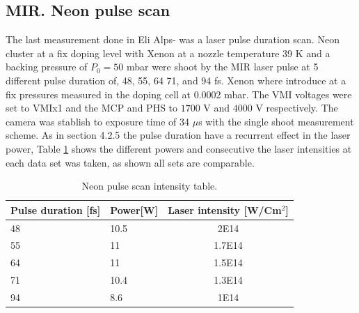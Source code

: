 \subsection{MIR. Neon pulse scan}

The last measurement done in Eli Alps- was a laser pulse duration scan. Neon cluster at a fix doping level with Xenon at a  nozzle temperature 39 K and a backing pressure of $P_{0}=50$ mbar  were shoot by the MIR laser pulse at 5 different pulse duration of, 48, 55, 64 71, and 94 fs. Xenon where introduce at a fix pressures measured in the doping cell at 0.0002 mbar. The VMI voltages were set to VMIx1 and the MCP and PHS to $1700$ V and $4000$ V respectively. The camera was stablish to exposure time of 34 $\mu$s with the single shoot measurement scheme. As in section 4.2.5 the pulse duration have a recurrent effect in the laser power, Table \ref{tab:Neonpulsepower} shows the different powers and consecutive the laser intensities at each data set was taken, as shown all sets are comparable.

\begin{table}[t]
\centering

\begin{tabular}{|l|l|c|}
\hline
Pulse duration {[}fs{]} & \multicolumn{1}{c|}{Power{[}W{]}} & Laser intensity {[}W/Cm$^{2}${]} \\ \hline
48 & 10.5 & 2E14 \\ \hline
55 & 11 & 1.7E14 \\ \hline
64 & 11 & 1.5E14 \\ \hline
71 & 10.4 & 1.3E14 \\ \hline
94 & 8.6 & 1E14 \\ \hline
\end{tabular}
\caption{Neon pulse scan  intensity table.}
\label{tab:Neonpulsepower}
\end{table}



